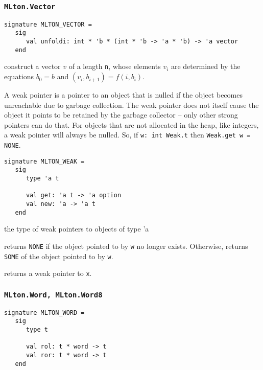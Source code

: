 \subsubsection{\tt MLton.Vector}

\begin{verbatim}
signature MLTON_VECTOR =
   sig
      val unfoldi: int * 'b * (int * 'b -> 'a * 'b) -> 'a vector
   end
\end{verbatim}

\begin{description}

construct a vector $v$ of a length {\tt n}, whose elements $v_i$ are determined
by the equations $b_0 = b$ and $(v_i, b_{i+1}) = f (i, b_i)$.

\end{description}

A weak pointer is a pointer to an object that is nulled if the
object becomes unreachable due to garbage collection.  The weak
pointer does not itself cause the object it points to be retained by
the garbage collector -- only other strong pointers can do that.
For objects that are not allocated in the heap, like integers, a weak
pointer will always be nulled.  So, if {\tt w: int Weak.t} then
{\tt Weak.get w = NONE}.
\begin{verbatim}
signature MLTON_WEAK =
   sig
      type 'a t

      val get: 'a t -> 'a option
      val new: 'a -> 'a t
   end
\end{verbatim}

\begin{description}
the type of weak pointers to objects of type 'a

returns {\tt NONE} if the object pointed to by {\tt w} no longer
exists.  Otherwise, returns {\tt SOME} of the object pointed to by
{\tt w}.

returns a weak pointer to {\tt x}.
\end{description}
%
\subsubsection{\tt MLton.Word, MLton.Word8}

\begin{verbatim}
signature MLTON_WORD =
   sig
      type t
         
      val rol: t * word -> t
      val ror: t * word -> t
   end
\end{verbatim}

